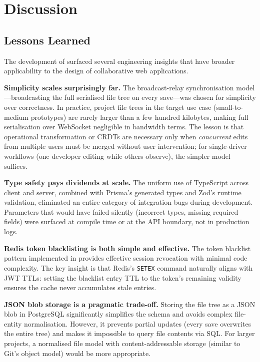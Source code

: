 \section{Discussion}
\label{sec:discussion}

\subsection{Lessons Learned}

The development of \echoray{} surfaced several engineering insights that have
broader applicability to the design of collaborative web applications.

\textbf{Simplicity scales surprisingly far.}
The broadcast-relay synchronisation model—broadcasting the full serialised
file tree on every save—was chosen for simplicity over correctness. In
practice, project file trees in the target use case (small-to-medium
prototypes) are rarely larger than a few hundred kilobytes, making full
serialisation over WebSocket negligible in bandwidth terms. The lesson is that
operational transformation or CRDTs are necessary only when \emph{concurrent}
edits from multiple users must be merged without user intervention; for
single-driver workflows (one developer editing while others observe), the
simpler model suffices.

\textbf{Type safety pays dividends at scale.}
The uniform use of TypeScript across client and server, combined with Prisma's
generated types and Zod's runtime validation, eliminated an entire category
of integration bugs during development. Parameters that would have failed
silently (incorrect types, missing required fields) were surfaced at compile
time or at the API boundary, not in production logs.

\textbf{Redis token blacklisting is both simple and effective.}
The token blacklist pattern implemented in \echoray{} provides effective
session revocation with minimal code complexity. The key insight is that
Redis's \texttt{SETEX} command naturally aligns with JWT TTLs: setting the
blacklist entry TTL to the token's remaining validity ensures the cache never
accumulates stale entries.

\textbf{JSON blob storage is a pragmatic trade-off.}
Storing the file tree as a JSON blob in PostgreSQL significantly simplifies the
schema and avoids complex file-entity normalisation. However, it prevents
partial updates (every save overwrites the entire tree) and makes it impossible
to query file contents via SQL. For larger projects, a normalised file model
with content-addressable storage (similar to Git's object model) would be more
appropriate.

